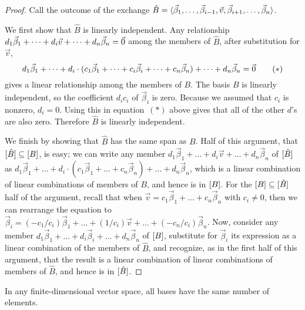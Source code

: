 \begin{proof}
Call the outcome of the exchange 
\( \hat{B}=\langle\vec{\beta}_1,\dots,\vec{\beta}_{i-1},\vec{v},
                       \vec{\beta}_{i+1},\dots,\vec{\beta}_n\rangle  \).

We first show that $\hat{B}$ is linearly independent.
Any relationship 
\( d_1\vec{\beta}_1+\dots+d_i\vec{v}+\dots+d_n\vec{\beta}_n=\vec{0} \)
among the members of $\hat{B}$, after substitution for $\vec{v}$,
\begin{equation*}
  d_1\vec{\beta}_1+\dots
    +d_i\cdot(c_1\vec{\beta}_1+\dots+c_i\vec{\beta}_i+\dots+c_n\vec{\beta}_n)
    +\dots+d_n\vec{\beta}_n
  =\vec{0}
\tag*{($*$)}\end{equation*}
gives a linear relationship among the members of $B$.
The basis $B$ is linearly independent, so the coefficient $d_ic_i$ of 
$\vec{\beta}_i$ is zero.
Because we assumed that $c_i$ is nonzero, $d_i=0$.
Using this in equation~$(*)$ above gives that all of the other $d$'s are also
zero.
Therefore $\hat{B}$ is linearly independent.

We finish by showing that $\hat{B}$ has the same span as $B$.
Half of this argument, that $\relax [\smash{\hat{B}}\relax ]\subseteq\relax [B\relax ]$, 
is easy; we can write any member 
$d_1\vec{\beta}_1+\dots+d_i\vec{v}+\dots+d_n\vec{\beta}_n$
of $\relax [\smash{\hat{B}}\relax ]$ as
$
  d_1\vec{\beta}_1+\dots
    +d_i\cdot(c_1\vec{\beta}_1+\dots+c_n\vec{\beta}_n)
    +\dots+d_n\vec{\beta}_n
$,
which is a linear combination of linear combinations of members of $B$, and
hence is in $\relax [B\relax ]$.
For the $\relax [B\relax ]\subseteq\relax [\smash{\hat{B}}\relax ]$ half of the argument,
recall that when
$\vec{v}=c_1\vec{\beta}_1+\dots+c_n\vec{\beta}_n$ with $c_i\neq 0$,
then we can rearrange the equation to
$\vec{\beta}_i=(-c_1/c_i)\vec{\beta}_1+\dots+(1/c_i)\vec{v}+\dots
   +(-c_n/c_i)\vec{\beta}_n$.
Now, consider any member
$d_1\vec{\beta}_1+\dots+d_i\vec{\beta}_i+\dots+d_n\vec{\beta}_n$
of $\relax [B\relax ]$, substitute for $\vec{\beta}_i$ its expression as a linear
combination of the members of $\hat{B}$, and recognize, 
as in the first half of this argument, that the result is a linear
combination of linear combinations of members of $\hat{B}$, and hence is in 
$\relax [\smash{\hat{B}}\relax ]$.
\end{proof}

\begin{theorem}
\label{th:AllBasesSameSize}
In any finite-dimensional vector space, all 
bases have the same number of elements.
\end{theorem}

